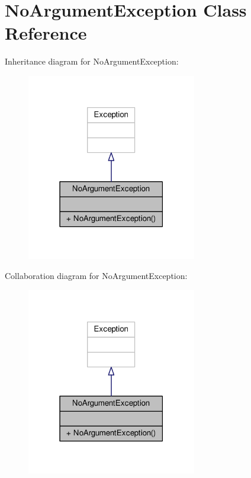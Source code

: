 \hypertarget{classNoArgumentException}{\section{No\-Argument\-Exception Class Reference}
\label{classNoArgumentException}
}


Inheritance diagram for No\-Argument\-Exception\-:
\nopagebreak
\begin{figure}[H]
\begin{center}
\leavevmode
\includegraphics[width=210pt]{classNoArgumentException__inherit__graph}
\end{center}
\end{figure}


Collaboration diagram for No\-Argument\-Exception\-:
\nopagebreak
\begin{figure}[H]
\begin{center}
\leavevmode
\includegraphics[width=210pt]{classNoArgumentException__coll__graph}
\end{center}
\end{figure}
